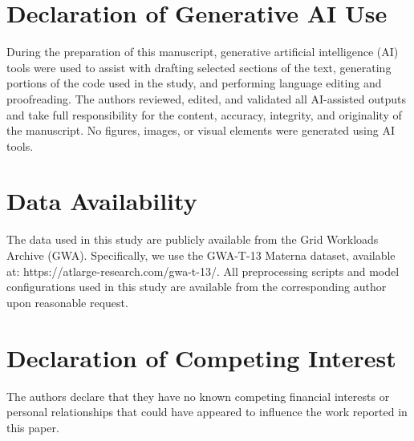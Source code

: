 \documentclass[a4paper,fleqn]{cas-dc}
\begin{document}
\section*{Declaration of Generative AI Use}

During the preparation of this manuscript, generative artificial intelligence (AI) tools were used to assist with drafting selected sections of the text, generating portions of the code used in the study, and performing language editing and proofreading. The authors reviewed, edited, and validated all AI-assisted outputs and take full responsibility for the content, accuracy, integrity, and originality of the manuscript. No figures, images, or visual elements were generated using AI tools.

\section*{Data Availability}

The data used in this study are publicly available from the Grid Workloads Archive (GWA). Specifically, we use the GWA-T-13 Materna dataset, available at: https://atlarge-research.com/gwa-t-13/. All preprocessing scripts and model configurations used in this study are available from the corresponding author upon reasonable request.

\section*{Declaration of Competing Interest}

The authors declare that they have no known competing financial interests or personal relationships that could have appeared to influence the work reported in this paper.

\printcredits
\end{document}
